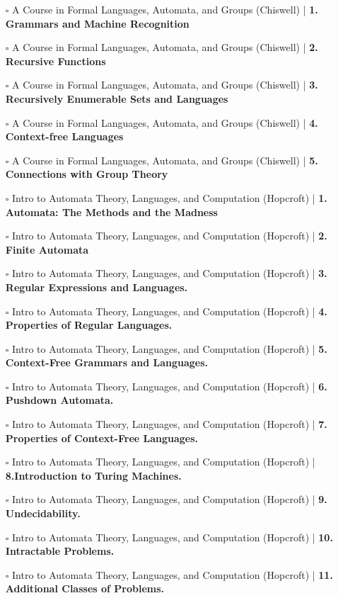 \documentclass[a4, landscape, 12pt]{article}
\newcommand{\checkbox}{$\square$}%
\begin{document}
\begin{itemize}
{}
\item [\checkbox]  A Course in Formal Languages, Automata, and Groups (Chiswell)  | \textbf{ 1. Grammars and Machine Recognition
}
\item [\checkbox]  A Course in Formal Languages, Automata, and Groups (Chiswell)  | \textbf{ 2. Recursive Functions
}
\item [\checkbox]  A Course in Formal Languages, Automata, and Groups (Chiswell)  | \textbf{ 3. Recursively Enumerable Sets and Languages
}
\item [\checkbox]  A Course in Formal Languages, Automata, and Groups (Chiswell)  | \textbf{ 4. Context-free Languages
}
\item [\checkbox]  A Course in Formal Languages, Automata, and Groups (Chiswell)  | \textbf{ 5. Connections with Group Theory
}
\item [\checkbox]  Intro to Automata Theory, Languages, and Computation (Hopcroft) | \textbf{ 1. Automata: The Methods and the Madness
}
\item [\checkbox]  Intro to Automata Theory, Languages, and Computation (Hopcroft) | \textbf{ 2. Finite Automata
}
\item [\checkbox]  Intro to Automata Theory, Languages, and Computation (Hopcroft) | \textbf{ 3. Regular Expressions and Languages.
}
\item [\checkbox]  Intro to Automata Theory, Languages, and Computation (Hopcroft) | \textbf{ 4. Properties of Regular Languages.
}
\item [\checkbox]  Intro to Automata Theory, Languages, and Computation (Hopcroft) | \textbf{ 5. Context-Free Grammars and Languages.
}
\item [\checkbox]  Intro to Automata Theory, Languages, and Computation (Hopcroft) | \textbf{ 6. Pushdown Automata.
}
\item [\checkbox]  Intro to Automata Theory, Languages, and Computation (Hopcroft) | \textbf{ 7. Properties of Context-Free Languages.
}
\item [\checkbox]  Intro to Automata Theory, Languages, and Computation (Hopcroft) | \textbf{ 8.Introduction to Turing Machines.
}
\item [\checkbox]  Intro to Automata Theory, Languages, and Computation (Hopcroft) | \textbf{ 9. Undecidability.
}
\item [\checkbox]  Intro to Automata Theory, Languages, and Computation (Hopcroft) | \textbf{ 10. Intractable Problems.
}
\item [\checkbox]  Intro to Automata Theory, Languages, and Computation (Hopcroft) | \textbf{ 11. Additional Classes of Problems.
}
\end{itemize}
\end{document}
